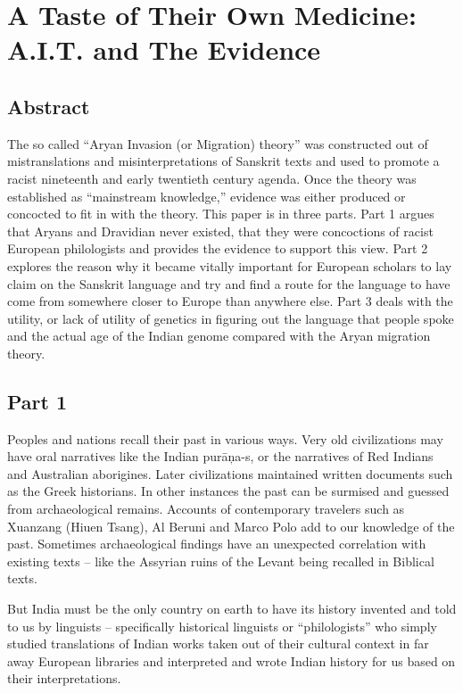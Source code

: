 
\chapter{A Taste of Their Own Medicine: A.I.T. and The Evidence}\label{intro}



\section*{Abstract}

The so called “Aryan Invasion (or Migration) theory” was constructed out of mistranslations and misinterpretations of Sanskrit texts and used to promote a racist nineteenth and early twentieth century agenda. Once the theory was established as “mainstream knowledge,” evidence was either produced or concocted to fit in with the theory. This paper is in three parts. Part 1 argues that Aryans and Dravidian never existed, that they were concoctions of racist European philologists and provides the evidence to support this view. Part 2 explores the reason why it became vitally important for European scholars to lay claim on the Sanskrit language and try and find a route for the language to have come from somewhere closer to Europe than anywhere else. Part 3 deals with the utility, or lack of utility of genetics in figuring out the language that people spoke and the actual age of the Indian genome compared with the Aryan migration theory.


\section*{Part 1}

Peoples and nations recall their past in various ways. Very old civilizations may have oral narratives like the Indian purāņa-s, or the narratives of Red Indians and Australian aborigines. Later civilizations maintained written documents such as the Greek historians. In other instances the past can be surmised and guessed from archaeological remains. Accounts of contemporary travelers such as Xuanzang (Hiuen Tsang), Al Beruni and Marco Polo add to our knowledge of the past. Sometimes archaeological findings have an unexpected correlation with existing texts – like the Assyrian ruins of the Levant being recalled in Biblical texts.

But India must be the only country on earth to have its history invented and told to us by linguists – specifically historical linguists or “philologists” who simply studied translations of Indian works taken out of their cultural context in far away European libraries and interpreted and wrote Indian history for us based on their interpretations.

